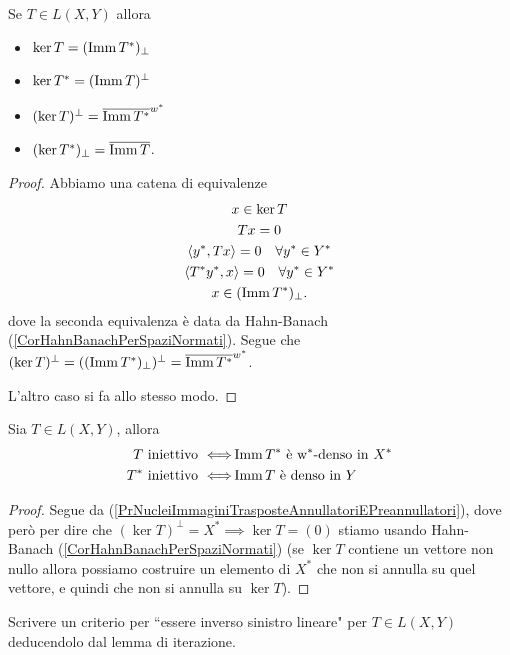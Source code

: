 \begin{proposition}\label{PrNucleiImmaginiTrasposteAnnullatoriEPreannullatori}
Se $T\in L(X,Y)$ allora
\begin{itemize}
    \item $\ker T=(\operatorname{Imm} T^\ast)_\perp$
    \item $\ker T^\ast=(\operatorname{Imm} T)^\perp$
    \item $(\ker T)^\perp =\overline{\operatorname{Imm} T^\ast}^{w^\ast}$
    \item $(\ker T^\ast)_\perp=\overline{\operatorname{Imm} T}$.
\end{itemize}
\end{proposition}
\begin{proof}
Abbiamo una catena di equivalenze
\begin{gather*}
    x\in \ker T\\
    Tx=0\\
    \left\langle {y^\ast,Tx}\right\rangle=0\quad \forall y^\ast\in Y^\ast\\
    \left\langle {T^\ast y^\ast,x}\right\rangle=0\quad \forall y^\ast\in Y^\ast\\
    x\in (\operatorname{Imm} T^\ast)_\perp.
\end{gather*}
dove la seconda equivalenza \`e data da Hahn-Banach (\ref{CorHahnBanachPerSpaziNormati}).
Segue che $(\ker T)^\perp=((\operatorname{Imm} T^\ast)_\perp)^\perp=\overline{\operatorname{Imm} T^\ast}^{w^\ast}$.

L'altro caso si fa allo stesso modo.
\end{proof}

\begin{corollary}\label{CorIniettivitaEAggiunti}
Sia $T\in L(X,Y)$, allora
\begin{align*}
    T\text{ iniettivo }\Longleftrightarrow&\operatorname{Imm} T^\ast\text{ \`e w$^{\ast}$-denso in }X^\ast\\
    T^\ast\text{ iniettivo }\Longleftrightarrow&\operatorname{Imm} T\text{ \`e denso in }Y
\end{align*}
\end{corollary}
\begin{proof}
Segue da (\ref{PrNucleiImmaginiTrasposteAnnullatoriEPreannullatori}), dove per\`o per dire che $(\ker T)^\perp=X^\ast\implies \ker T=(0)$ stiamo usando Hahn-Banach (\ref{CorHahnBanachPerSpaziNormati}) (se $\ker T$ contiene un vettore non nullo allora possiamo costruire un elemento di $X^\ast$ che non si annulla su quel vettore, e quindi che non si annulla su $\ker T$).
\end{proof}

\begin{exercise}
Scrivere un criterio per ``essere inverso sinistro lineare" per $T\in L(X,Y)$ deducendolo dal lemma di iterazione.
\end{exercise}


